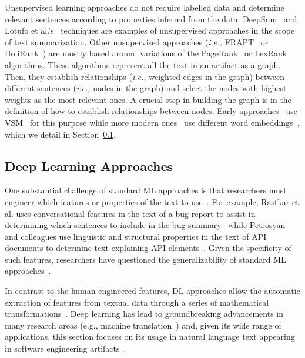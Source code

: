 Unsupervised learning approaches do not require labelled data and determine 
relevant sentences according to properties inferred from the data. 
DeepSum~\cite{Li2018} and Lotufo et al.'s~\cite{Lotufo2012} techniques are examples of 
unsupervised approaches in the scope of text summarization. Other unsupervised approaches 
(\textit{i.e.,} {\small FRAPT}~\cite{Jiang2017} or HoliRank~\cite{Ponzanelli2015, Ponzanelli2017})
are mostly based around variations of the PageRank~\cite{Page1999} or LexRank~\cite{Erkan2004} algorithms. 
These algorithms represent all the text in an artifact as a graph.
Then, they establish relationships (\textit{i.e.,} weighted edges in the graph) 
between different sentences (\textit{i.e.,} nodes in the graph) 
and select the nodes with highest weights as the most relevant ones.
A crucial step in building the graph is in the definition of 
how to establish  relationships between nodes.
Early approaches~\cite{Lotufo2012, Jiang2017} 
use \ac{VSM}~\cite{Salton1975vsm} 
for this purpose while more modern ones~\cite{Huang2018, silva2019}
use different word embeddings~\cite{Mikolov2013, bojanowski2017FastText},
which we detail in Section~\ref{cp2:deep-learning}.










\subsection{Deep Learning Approaches}
\label{cp2:deep-learning}



One substantial challenge of standard \acf{ML}
approaches is that researchers must engineer which 
features or properties of the text to use~\cite{ferreira2021}.
For example, Rastkar et al. uses conversational features in 
the text of a bug report to assist in determining which sentences 
to include in the bug summary~\cite{Rastkar2010}
while Petrosyan and colleagues use 
linguistic and structural properties 
in the text of API documents to determine text 
explaining API elements~\cite{Petrosyan2015}.
Given the specificity of such features, 
researchers have questioned the generalizability
of standard \acs{ML} approaches~\cite{Xiao2018, fucci2019}.



In contrast to the human engineered features,
\acf{DL} approaches allow the automatic extraction of features 
from textual data through a series of mathematical transformations~\cite{Deng2018, zhang2021deep}.
Deep learning has lead to groundbreaking advancements in many 
research areas (e.g., machine translation~\cite{lopez2008translation}) 
and, given its wide range of applications, this section
focuses on its usage in natural language text appearing in software engineering artifacts~\cite{ferreira2021, li2018deep, watson2022}.










